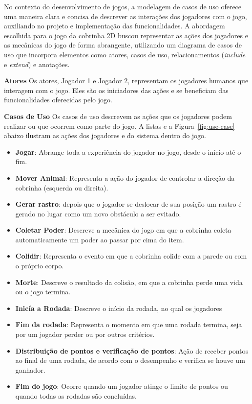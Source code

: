 No contexto do desenvolvimento de jogos, a modelagem de casos de uso oferece uma maneira clara e concisa de descrever as interações dos jogadores com o jogo, auxiliando no projeto e implementação das funcionalidades. A abordagem escolhida para o jogo da cobrinha 2D buscou representar as ações dos jogadores e as mecânicas do jogo de forma abrangente, utilizando um diagrama de casos de uso que incorpora elementos como atores, casos de uso, relacionamentos (\textit{include} e \textit{extend}) e anotações.

\textbf{Atores}
Os atores, Jogador 1 e Jogador 2, representam os jogadores humanos que interagem com o jogo. Eles são os iniciadores das ações e se beneficiam das funcionalidades oferecidas pelo jogo.

\textbf{Casos de Uso}
Os casos de uso descrevem as ações que os jogadores podem realizar ou que ocorrem como parte do jogo. A listas e a Figura~\ref{fig:use-case} abaixo ilustram as ações dos jogadores e do sistema dentro do jogo.

\begin{itemize}
  \item \textbf{Jogar}: Abrange toda a experiência do jogador no jogo, desde o início até o fim.
  \item \textbf{Mover Animal}: Representa a ação do jogador de controlar a direção da cobrinha (esquerda ou direita).
  \item \textbf{Gerar rastro}: depois que o jogador se deslocar de sua posição um rastro é gerado no lugar como um novo obstáculo a ser evitado.
  \item \textbf{Coletar Poder}: Descreve a mecânica do jogo em que a cobrinha coleta automaticamente um poder ao passar por cima do item.
  \item \textbf{Colidir}: Representa o evento em que a cobrinha colide com a parede ou com o próprio corpo.
  \item \textbf{Morte}: Descreve o resultado da colisão, em que a cobrinha perde uma vida ou o jogo termina.
  \item \textbf{Inicía a Rodada}: Descreve o início da rodada, no qual os jogadores
  \item \textbf{Fim da rodada}: Representa o momento em que uma rodada termina, seja por um jogador perder ou por outros critérios.
  \item \textbf{Distribuição de pontos e verificação de pontos}: Ação de receber pontos ao final de uma rodada, de acordo com o desempenho e verifica se houve um ganhador.
  \item \textbf{Fim do jogo}: Ocorre quando um jogador atinge o limite de pontos ou quando todas as rodadas são concluídas.
\end{itemize}

